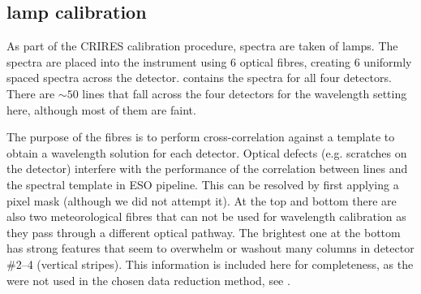 \subsection{\thar{} lamp calibration}
\label{subsec:th-ar}
As part of the {CRIRES} calibration procedure, spectra are taken of \thar{} lamps. The \thar{} spectra are placed into the instrument using 6 optical fibres, creating 6 uniformly spaced spectra across the detector.
 contains the \thar{} spectra for all four detectors. There are \(\sim50\) \thar{} lines that fall across the four detectors for the wavelength setting here, although most of them are faint.

The purpose of the \thar{} fibres is to perform cross-correlation against a \thar{} template to obtain a wavelength solution for each detector. Optical defects (e.g. scratches on the detector) interfere with the performance of the correlation between \thar{} lines and the spectral template in {ESO} pipeline. This can be resolved by first applying a pixel mask (although we did not attempt it). At the top and bottom there are also two meteorological fibres that can not be used for wavelength calibration as they pass through a different optical pathway. The brightest one at the bottom has strong features that seem to overwhelm or washout many columns in detector \#2--4 (vertical stripes). 
This information is included here for completeness, as the \thar{} were not used in the chosen data reduction method, see .


